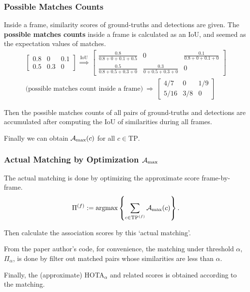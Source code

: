 \documentclass[slidetop, mathserif, dvipsnames]{beamer}
\begin{document}
\begin{frame}
	\frametitle{Possible Matches Counts}

	Inside a frame, similarity scores of ground-truths and detections are given.
	The {\bf possible matches counts} inside a frame
	is calculated as an IoU, and seemed as the expectation values of matches.
	\begin{align*}
	\begin{bmatrix}	
	0.8                       & 0                       & 0.1                     \\
	0.5                       & 0.3                     & 0                       
	\end{bmatrix}
	\ \stackrel{\text{IoU}}{\Rightarrow}\ 
	\begin{bmatrix}
	\frac{0.8}{0.8+0+0.1+0.5} & 0                       & \frac{0.1}{0.8+0+0.1+0} \\
	\frac{0.5}{0.8+0.5+0.3+0} & \frac{0.3}{0+0.5+0.3+0} & 0                       
	\end{bmatrix} \\
	\text{(possible matches count inside a frame)}~ \Rightarrow ~ 
	\begin{bmatrix}
	4/7                       & 0                       & 1/9                     \\
	5/16                      & 3/8                     & 0                       
	\end{bmatrix}
	\end{align*}

	Then the possible matches counts of all pairs of ground-truths and detections
	are accumulated after computing the IoU of similarities during all frames.

	Finally we can obtain $\mathcal A_{\rm max}(c)$ for
	all $c\in\text{TP}$.

\end{frame}

\begin{frame}
	\frametitle{Actual Matching by Optimization $\mathcal A_{\rm max}$}

	The actual matching is done by
	optimizing the approximate score frame-by-frame.
	\[
		\Pi^{(f)} := 
		\text{argmax}\left\{ \sum\limits_{c\in\text{TP}^{(f)}} \mathcal A_{\rm max}(c) \right\}.
	\]

	Then calculate the association scores by this `actual matching'.

	\vspace{3pt}

	From the paper author's code, for convenience, 
	the matching under threshold $\alpha$, $\Pi_\alpha$, is done by
	filter out matched pairs whose similarities are less than $\alpha$.

	\vspace{5pt}

	Finally, the (approximate) HOTA$_\alpha$ and related scores
	is obtained according to the matching.

\end{frame}
\end{document}
